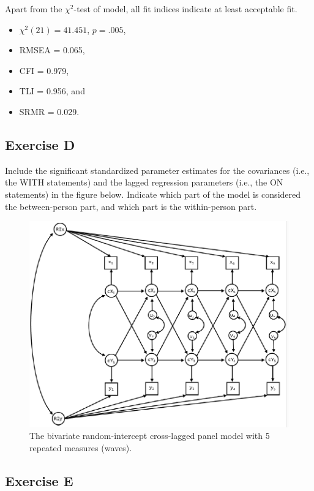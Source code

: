 \documentclass[
]{book}
\providecommand{\tightlist}{%
  \setlength{\itemsep}{0pt}\setlength{\parskip}{0pt}}
\begin{document}
Apart from the \(\chi^{2}\)-test of model, all fit indices indicate at least acceptable fit.

\begin{itemize}
\tightlist
\item
  \(\chi^{2} (21) = 41.451\), \(p = .005\),
\item
  RMSEA = 0.065,
\item
  CFI = 0.979,
\item
  TLI = 0.956, and
\item
  SRMR = 0.029.
\end{itemize}

\hypertarget{exercise-d-1}{%
\subsection{Exercise D}\label{exercise-d-1}}

Include the significant standardized parameter estimates for the covariances (i.e., the WITH statements) and the lagged regression parameters (i.e., the ON statements) in the figure below. Indicate which part of the model is considered the between-person part, and which part is the within-person part.

\begin{figure}
\centering
\includegraphics[width=5.20833in,height=\textheight]{RICLPM-5waves.png}
\caption{The bivariate random-intercept cross-lagged panel model with 5 repeated measures (waves).}
\end{figure}

\hypertarget{exercise-e-1}{%
\subsection{Exercise E}\label{exercise-e-1}}
\end{document}
